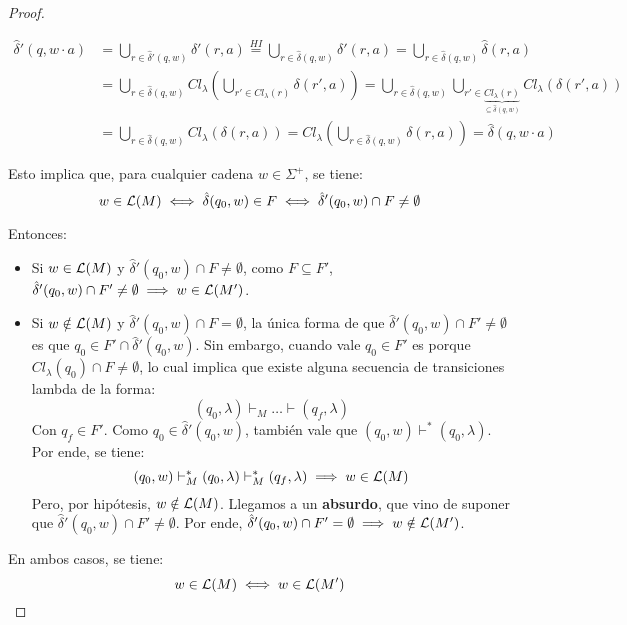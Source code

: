 \begin{proof}
\begin{itemize}
        $$
        \begin{aligned}
            \hat \delta'(q, w \cdot a)
            & = \bigcup_{r \in \hat \delta'(q, w)} \delta'(r, a)
            \overset{HI}{=} \bigcup_{r \in \hat \delta(q, w)} \delta'(r, a)
            = \bigcup_{r \in \hat \delta(q, w)} \hat \delta(r, a) \\
            & = \bigcup_{r \in \hat \delta(q, w)} Cl_\lambda\left(\bigcup_{r' \in Cl_\lambda(r)} \delta(r', a)\right) = \bigcup_{r \in \hat \delta(q, w)} \bigcup_{r' \in \underbrace{Cl_\lambda(r)}_{\subseteq \hat \delta(q, w)}} Cl_\lambda(\delta(r', a)) \\
            & = \bigcup_{r \in \hat \delta(q, w)} Cl_\lambda(\delta(r, a)) = Cl_\lambda\left(\bigcup_{r \in \hat \delta(q, w)} \delta(r, a)\right) = \hat \delta (q, w \cdot a)
        \end{aligned}
        $$
    \end{itemize}

    Esto implica que, para cualquier cadena $w \in \Sigma^+$, se tiene:
    $$w \in \mathcal{L}(M) \iff \hat \delta(q_0, w) \in F \iff \hat \delta'(q_0, w) \cap F \neq \emptyset$$

    Entonces:
    \begin{itemize}
        \item Si $w \in \mathcal{L}(M)$ y $\hat \delta'(q_0, w) \cap F \neq \emptyset$, como $F \subseteq F'$, $\hat \delta'(q_0, w) \cap F' \neq \emptyset \implies w \in \mathcal{L}(M')$.
        \item Si $w \notin \mathcal{L}(M)$ y $\hat \delta'(q_0, w) \cap F = \emptyset$, la única forma de que $\hat \delta'(q_0, w) \cap F' \neq \emptyset$ es que $q_0 \in F' \cap \hat \delta'(q_0, w)$. Sin embargo, cuando vale $q_0 \in F'$ es porque $Cl_\lambda(q_0) \cap F \neq \emptyset$, lo cual implica que existe alguna secuencia de transiciones lambda de la forma:
        $$(q_0, \lambda) \vdash_M \dots \vdash (q_f, \lambda)$$
        Con $q_f \in F'$. Como $q_0 \in \hat \delta'(q_0, w)$, también vale que $(q_0, w) \vdash^* (q_0, \lambda)$. Por ende, se tiene:
        $$(q_0, w) \vdash_M^* (q_0, \lambda) \vdash_M^* (q_f, \lambda) \implies w \in \mathcal{L}(M)$$
        Pero, por hipótesis, $w \notin \mathcal{L}(M)$. Llegamos a un \textbf{absurdo}, que vino de suponer que $\hat \delta'(q_0, w) \cap F' \neq \emptyset$. Por ende, $\hat \delta'(q_0, w) \cap F' = \emptyset \implies w \notin \mathcal{L}(M')$.
    \end{itemize}

    En ambos casos, se tiene:
    $$w \in \mathcal{L}(M) \iff w \in \mathcal{L}(M')$$
\end{proof}

